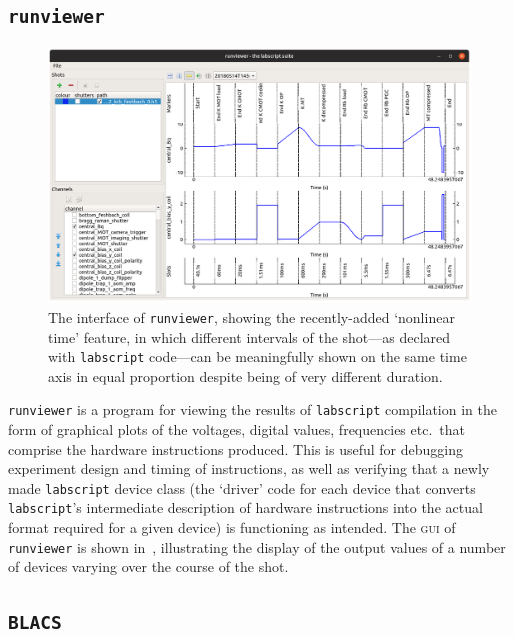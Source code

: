 \subsection{\texttt{runviewer}}

\begin{figure}[t]
\begin{center}
\includegraphics[width=\textwidth]{figures/software/new_screenshots/runviewer.png}
\caption{The interface of \texttt{runviewer}, showing the recently-added `nonlinear time' feature, in which different intervals of the shot---as declared with \texttt{labscript} code---can be meaningfully shown on the same time axis in equal proportion despite being of very different duration.}\label{fig:runviewer}
\end{center}
\end{figure}

\texttt{runviewer} is a program for viewing the results of \texttt{labscript} compilation in the form of graphical plots of the voltages, digital values, frequencies etc.~that comprise the hardware instructions produced. This is useful for debugging experiment design and timing of instructions, as well as verifying that a newly made \texttt{labscript} device class (the `driver' code for each device that converts \texttt{labscript}'s intermediate description of hardware instructions into the actual format required for a given device) is functioning as intended. The \textsc{gui} of \texttt{runviewer} is shown in~, illustrating the display of the output values of a number of devices varying over the course of the shot.

\subsection{\texttt{BLACS}}

